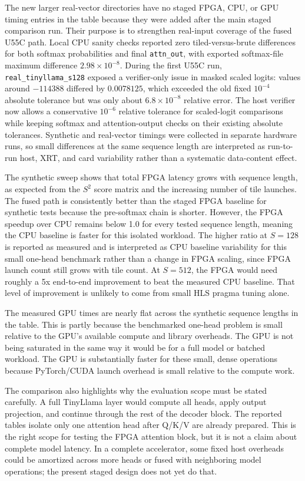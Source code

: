 \documentclass[conference]{IMSTemplate}
\begin{document}
The new larger real-vector directories have no staged FPGA, CPU, or GPU timing
entries in the table because they were added after the main staged comparison
run. Their purpose is to strengthen real-input coverage of the fused U55C path.
Local CPU sanity checks reported zero tiled-versus-brute differences for both
softmax probabilities and final \texttt{attn\_out}, with exported softmax-file
maximum difference \(2.98\times10^{-8}\). During the first U55C run,
\texttt{real\_tinyllama\_s128} exposed a verifier-only issue in masked scaled
logits: values around \(-114388\) differed by \(0.0078125\), which exceeded the
old fixed \(10^{-4}\) absolute tolerance but was only about \(6.8\times10^{-8}\)
relative error. The host verifier now allows a conservative \(10^{-6}\)
relative tolerance for scaled-logit comparisons while keeping softmax and
attention-output checks on their existing absolute tolerances.
Synthetic and real-vector timings were collected in separate hardware runs, so
small differences at the same sequence length are interpreted as run-to-run
host, XRT, and card variability rather than a systematic data-content effect.

The synthetic sweep shows that total FPGA latency grows with sequence length,
as expected from the \(S^2\) score matrix and the increasing number of tile
launches. The fused path is consistently better than the staged FPGA baseline
for synthetic tests because the pre-softmax chain is shorter. However, the FPGA
speedup over CPU remains below 1.0 for every tested sequence length, meaning
the CPU baseline is faster for this isolated workload. The higher ratio at
\(S=128\) is reported as measured and is
interpreted as CPU baseline variability for this small one-head benchmark
rather than a change in FPGA scaling, since FPGA launch count still grows with
tile count. At \(S=512\), the FPGA would need roughly a 5x end-to-end
improvement to beat the measured CPU baseline. That level of improvement is
unlikely to come from small HLS pragma tuning alone.

The measured GPU times are nearly flat across the synthetic sequence lengths in
the table. This is partly because the benchmarked one-head problem is small
relative to the GPU's available compute and library overheads. The GPU is not
being saturated in the same way it would be for a full model or batched
workload. The GPU is substantially faster for these small, dense operations because
PyTorch/CUDA launch overhead is small relative to the compute work.

The comparison also highlights why the evaluation scope must be stated
carefully. A full TinyLlama layer would compute all heads, apply output
projection, and continue through the rest of the decoder block. The reported
tables isolate only one attention head after Q/K/V are already prepared. This
is the right scope for testing the FPGA attention block, but it is not a claim
about complete model latency. In a complete accelerator, some fixed host
overheads could be amortized across more heads or fused with neighboring model
operations; the present staged design does not yet do that.
\end{document}
